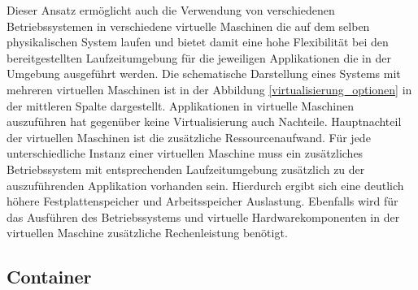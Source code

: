  Dieser Ansatz ermöglicht auch die Verwendung von verschiedenen Betriebssystemen in verschiedene virtuelle Maschinen die auf dem selben physikalischen System laufen und bietet damit eine hohe Flexibilität bei den bereitgestellten Laufzeitumgebung für die jeweiligen Applikationen die in der Umgebung ausgeführt werden. Die schematische Darstellung eines Systems mit mehreren virtuellen Maschinen ist in der Abbildung \ref{virtualisierung_optionen} in der mittleren Spalte dargestellt. Applikationen in virtuelle Maschinen auszuführen hat gegenüber keine Virtualisierung auch Nachteile. Hauptnachteil der virtuellen Maschinen ist die zusätzliche Ressourcenaufwand. Für jede unterschiedliche Instanz einer virtuellen Maschine muss ein zusätzliches Betriebssystem mit entsprechenden Laufzeitumgebung zusätzlich zu der auszuführenden Applikation vorhanden sein. Hierdurch ergibt sich eine deutlich höhere Festplattenspeicher und Arbeitsspeicher Auslastung. Ebenfalls wird für das Ausführen des Betriebssystems und virtuelle Hardwarekomponenten in der virtuellen Maschine zusätzliche Rechenleistung benötigt. \cite{Mavridis2019} 

\subsection{Container}

